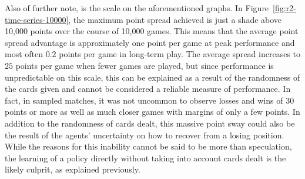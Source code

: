 Also of further note, is the scale on the aforementioned graphs.
%
In Figure~\ref{fig:r2-time-series-10000},
the maximum point spread achieved is just a shade above 10,000 points
over the course of 10,000 games.
%
This means that the average point spread advantage is approximately 
one point per game at peak performance\textemdash
and most often $0.2$ points per game\textemdash
in long-term play.
%
The average spread increases to $25$ points per game when fewer games are 
played,
but since performance is unpredictable on this scale,
this can be explained as a result of the randomness of the cards given
and cannot be considered a reliable measure of performance.
%
In fact,
in sampled matches,
it was not uncommon to observe losses and wins of 30 points or more
as well as much closer games with margins of only a few points.
%
In addition to the randomness of cards dealt,
this massive point sway could also be the result of the agents' uncertainty on 
how to recover from a losing position.
%
While the reasons for this inability cannot be said to be more than speculation,
the learning of a policy directly without taking into account cards dealt
is the likely culprit,
as explained previously.

